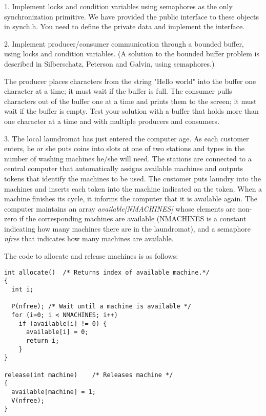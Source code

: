 \begin{description}

\item{1.}
Implement locks and condition variables using semaphores as the only
synchronization primitive.  We have provided the public interface to these 
objects in synch.h.  You need to define the private data and implement
the interface.

\item{2.}
Implement producer/consumer communication through a bounded buffer,  
using locks and condition variables.  (A solution to the bounded buffer 
problem is described in Silberschatz, Peterson and Galvin, using 
semaphores.)

The producer places characters from the string "Hello world" into the 
buffer one character at a time; it must wait if the buffer is full.
The consumer pulls characters out of the buffer one at a time
and prints them to the screen; it must wait if the buffer is empty.
Test your solution with a buffer that holds more than one
character at a time and with multiple producers and consumers.

\item{3.} The local laundromat has just entered the computer age.
As each customer enters, he or she puts coins into
slots at one of two stations and types in
the number of washing machines he/she will need.  The stations
are connected to a central computer that
automatically assigns available machines and outputs
tokens that identify the machines to be used.  The
customer puts laundry into the machines and inserts each
token into the machine indicated on the token.  When a machine finishes
its cycle, it informs the computer that it is available again.
The computer maintains an array {\em available[NMACHINES]} whose elements are
non-zero if the corresponding machines are available (NMACHINES is
a constant indicating how many machines there are in the
laundromat), and a semaphore {\em nfree} that indicates how many 
machines are available.

The code to allocate and release machines is as follows:

\begin{verbatim}
int allocate()	/* Returns index of available machine.*/
{
  int i;

  P(nfree);	/* Wait until a machine is available */
  for (i=0; i < NMACHINES; i++)
    if (available[i] != 0) {
      available[i] = 0;
      return i;
    }
}

release(int machine)	/* Releases machine */
{
  available[machine] = 1;
  V(nfree);
}
\end{verbatim}


\end{description}
